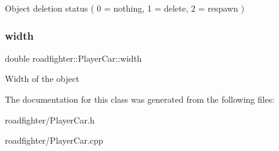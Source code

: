 Object deletion status ( 0 = nothing, 1 = delete, 2 = respawn ) \mbox{\label{classroadfighter_1_1PlayerCar_aeb7ba30397f5c61a94f4630d8ac1d2c9}} 
\subsubsection{\texorpdfstring{width}{width}}
{\footnotesize\ttfamily double roadfighter\+::\+Player\+Car\+::width\hspace{0.3cm}{\ttfamily [protected]}}

Width of the object 

The documentation for this class was generated from the following files\+:\begin{DoxyCompactItemize}
\item 
roadfighter/Player\+Car.\+h\item 
roadfighter/Player\+Car.\+cpp\end{DoxyCompactItemize}

